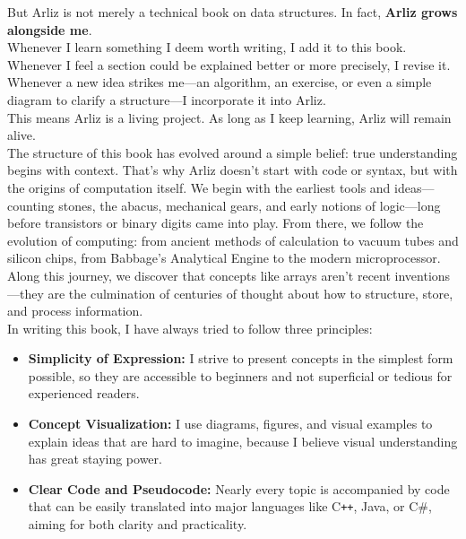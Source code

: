 \documentclass[12pt, oneside]{book}
\begin{document}
	But Arliz is not merely a technical book on data structures. In fact, \textbf{Arliz grows alongside me}. \\
	Whenever I learn something I deem worth writing, I add it to this book. Whenever I feel a section could be explained better or more precisely, I revise it. Whenever a new idea strikes me—an algorithm, an exercise, or even a simple diagram to clarify a structure—I incorporate it into Arliz.\\
	This means Arliz is a living project. As long as I keep learning, Arliz will remain alive.\\	
	The structure of this book has evolved around a simple belief: true understanding begins with context. That’s why Arliz doesn’t start with code or syntax, but with the origins of computation itself. We begin with the earliest tools and ideas—counting stones, the abacus, mechanical gears, and early notions of logic—long before transistors or binary digits came into play. From there, we follow the evolution of computing: from ancient methods of calculation to vacuum tubes and silicon chips, from Babbage’s Analytical Engine to the modern microprocessor. Along this journey, we discover that concepts like arrays aren’t recent inventions—they are the culmination of centuries of thought about how to structure, store, and process information.\\
	In writing this book, I have always tried to follow three principles:
	
	\begin{itemize}
		\item \textbf{Simplicity of Expression:} I strive to present concepts in the simplest form possible, so they are accessible to beginners and not superficial or tedious for experienced readers.
		\item \textbf{Concept Visualization:} I use diagrams, figures, and visual examples to explain ideas that are hard to imagine, because I believe visual understanding has great staying power.
		\item \textbf{Clear Code and Pseudocode:} Nearly every topic is accompanied by code that can be easily translated into major languages like C\texttt{++}, Java, or C\#, aiming for both clarity and practicality.
	\end{itemize}
	
\end{document}

